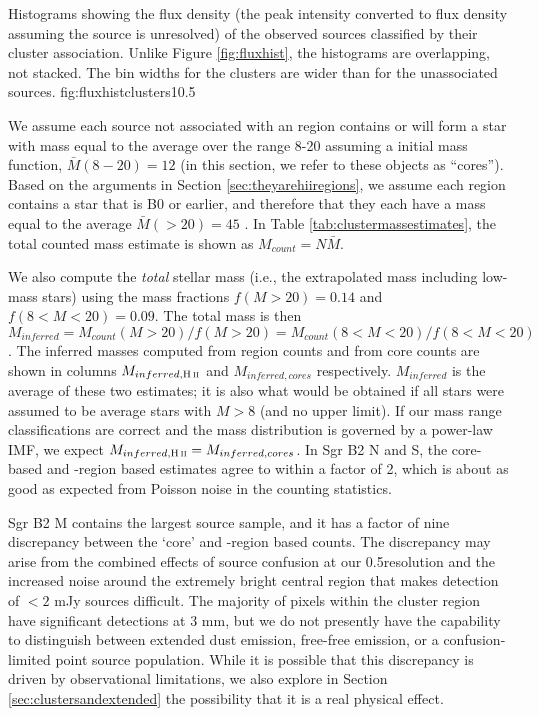 \documentclass[twocolumn]{aastex61}
\begin{document}
{Histograms showing the flux density (the peak intensity converted to flux density
assuming the source is unresolved) of the observed sources classified by their
cluster association.  Unlike Figure \ref{fig:fluxhist}, the histograms are
overlapping, not stacked.  The bin widths for the clusters are wider than
for the unassociated sources.}
{fig:fluxhistclusters}{1}{0.5\textwidth}


We assume each source not associated with an \hii region contains or will form
a star with mass equal to
the average over the range 8-20 \msun assuming a \citet{Kroupa2001a} initial
mass function, $\bar{M}(8-20) = 12$ \msun (in this section, we refer
to these objects as ``cores'').  Based on the arguments in Section
\ref{sec:theyarehiiregions}, we assume each \hii region contains a star that is
B0 or earlier, and therefore that they each have a mass equal to the
average $\bar{M}(>20) = 45$ \msun.  In Table
\ref{tab:clustermassestimates}, the total counted mass estimate is shown as
$M_{count} = N \bar{M}$.

We also compute the \emph{total} stellar mass (i.e., the extrapolated mass
including low-mass stars) using the mass fractions $f(M>20)
= 0.14$ and $f(8<M<20)=0.09$.  The total mass is then $M_{inferred} =
M_{count}(M>20) / f(M>20) =
M_{count}(8<M<20) / f(8<M<20)$.  The inferred masses computed from \hii region
counts and from core counts are shown in columns $M_{inferred,\hii}$ and
$M_{inferred,cores}$ respectively. $M_{inferred}$ is the average of these two
estimates; it is also what would be obtained if all stars were assumed to be
average stars with $M>8$ \msun (and no upper limit).  If our mass range
classifications are
correct and the mass distribution is governed by a power-law IMF, we expect
$M_{inferred,\hii} = M_{inferred,cores}$.  In Sgr B2 N and S, the core-based
and \hii-region based estimates agree to
within a factor of 2, which is about as good as expected from Poisson noise in
the counting statistics.  

Sgr B2 M contains the largest source sample, and it has a factor of nine
discrepancy between the `core' and \HII-region based counts. The discrepancy
may arise from the combined effects of source
confusion at our 0.5\arcsec resolution and the increased noise around the
extremely bright central region that makes detection of $<2$ mJy sources
difficult.  The majority of pixels within the cluster region have significant
detections at 3 mm, but we do not presently have the capability to distinguish
between extended dust emission, free-free emission, or a confusion-limited
point source population.  While it is possible that this discrepancy
is driven by observational limitations, we also explore in Section
\ref{sec:clustersandextended} the possibility that it is a real physical
effect.
\end{document}
